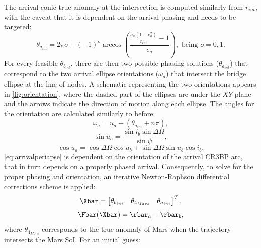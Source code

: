 The arrival conic true anomaly at the intersection is computed similarly from $r_{int}$, with the
caveat that it is dependent on the arrival phasing and needs to be targeted:
\begin{equation}
    \theta_{a_{int}}=2\pi o+(-1)^{o}\arccos(\frac{\frac{a_{a}(1-e_{a}^{2})}{r_{int}}-1}{e_{a}}),\text{ being }o=0,1.
    \label{eq:arrivalintersect}
\end{equation}
For every feasible $\theta_{b_{int}}$, there are then two possible phasing solutions
($\theta_{a_{int}}$) that correspond to the two arrival ellipse orientations ($\omega_{a}$) that
intersect the bridge ellipse at the line of nodes. A schematic representing the two orientations
appears in \cref{fig:orientation}, where the dashed part of the ellipses are under the $XY$-plane
and the arrows indicate the direction of motion along each ellipse. The angles for the orientation
are calculated similarly to before:
\begin{equation}
    \omega_{a}=u_{a}-(\theta_{a_{int}}+n\pi),
    \label{eq:arrivalperiapse}
\end{equation}
\vspace{1mm}
\begin{equation}
    \sin u_{a}=\frac{\sin i_{b}\sin\Delta\Omega}{\sin\psi},
    \label{eq:arrivalsinu}
\end{equation}
\vspace{1mm}
\begin{equation}
    \cos u_{a}=\cos\Delta\Omega\cos u_{b}+\sin\Delta\Omega\sin u_{b}\cos i_{b}.
    \label{eq:arrivalcosu}
\end{equation}
\cref{eq:arrivalperiapse} is dependent on the orientation of the arrival CR3BP arc, that in turn
depends on a properly phased arrival. Consequently, to solve for the proper phasing and
orientation, an iterative Newton-Raphson differential corrections scheme is applied:
\begin{equation}
    \Xbar=\begin{bmatrix}   \theta_{b_{int}}    &   \theta_{4_{Mars}}   &   \theta_{a_{int}}    \end{bmatrix}^{T},
    \label{eq:MMATfreevar}
\end{equation}
\vspace{1mm}
\begin{equation}
    \Fbar(\Xbar)=\rbar_{a}-\rbar_{b},
    \label{eq:MMATconst}
\end{equation}
where $\theta_{4_{Mars}}$ corresponds to the true anomaly of Mars when the trajectory intersects
the Mars SoI. For an initial guess:
